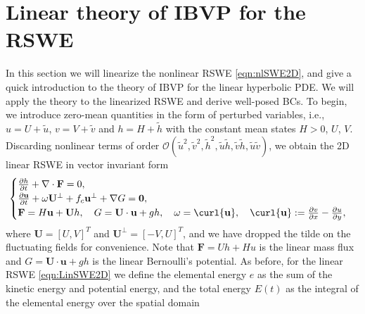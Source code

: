 \documentclass{article}
\numberwithin{equation}{section}
\theoremstyle{definition}
\begin{document}
\section{Linear theory of IBVP for the RSWE}\label{sec:linear-IBVP-RSWE}
In this section we will linearize the nonlinear RSWE  \eqref{eqn:nlSWE2D}, and  give a quick introduction to the theory of IBVP for the linear hyperbolic PDE. We will apply the theory to the linearized RSWE and derive well-posed BCs.
To begin, we introduce zero-mean quantities in the form of perturbed variables, i.e., $u = U + \widetilde{u}$, $v = V + \widetilde{v}$  and $h = H +\widetilde{h}$ with the constant mean states $H > 0$, $U$, $V$. Discarding nonlinear terms of order $\mathcal{O}(\widetilde{u}^2, \widetilde{v}^2, \widetilde{h}^2,\widetilde{u}\widetilde{h}, \widetilde{v}\widetilde{h}, \widetilde{u}\widetilde{v})$, we obtain 
the 2D linear RSWE in vector invariant form 
\begin{equation}\label{eqn:LinSWE2D}
    \begin{cases}
    \frac{\partial h}{\partial t } + \nabla \cdot \mathbf{F} = 0, \\
    \frac{\partial \mathbf{u}}{\partial t} + \omega \mathbf{U}^\perp + f_c \mathbf{u}^\perp + \nabla G = \mathbf{0},\\
     \mathbf{F}= H\mathbf{u} + \mathbf{U}h, \quad G = \mathbf{U}\cdot\mathbf{u} +gh, \quad\omega =  \curl{\mathbf{u}}, \quad \curl{\mathbf{u}}:= \frac{\partial v}{\partial x } - \frac{\partial u}{\partial y },  
    \end{cases}
\end{equation}
where $\mathbf{U} = [U, V]^T$ and $\mathbf{U}^\perp = [-V, U]^T$, and we have dropped the tilde on the fluctuating fields for convenience.
%
Note that $\mathbf{F} = Uh + Hu$ is the linear mass flux and $G = \mathbf{U}\cdot\mathbf{u} +gh$ is the linear Bernoulli's potential.
As before,  for the linear RSWE \eqref{eqn:LinSWE2D} we define the elemental energy $e$ as the sum of the kinetic energy and potential energy, and the total energy $E(t)$ as the integral of the elemental energy over the spatial domain
\end{document}
